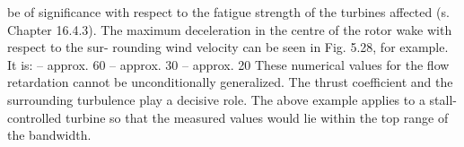 be of significance with respect to the fatigue strength of the turbines affected (s. Chapter
16.4.3).
The maximum deceleration in the centre of the rotor wake with respect to the sur-
rounding wind velocity can be seen in Fig. 5.28, for example. It is:
– approx. 60 %
– approx. 30 %
– approx. 20 %
These numerical values for the flow retardation cannot be unconditionally generalized. The
thrust coefficient and the surrounding turbulence play a decisive role. The above example
applies to a stall-controlled turbine so that the measured values would lie within the top
range of the bandwidth.
















